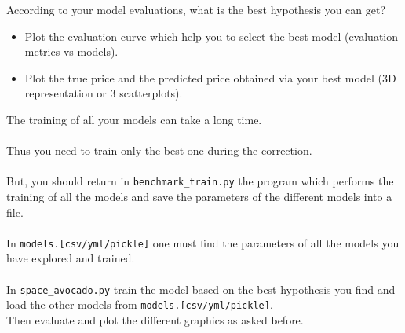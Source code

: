 According to your model evaluations, what is the best hypothesis you can get?
\begin{itemize}
  \item Plot the evaluation curve which help you to select the best model (evaluation metrics vs models).
  \item Plot the true price and the predicted price obtained via your best model (3D representation or 3 scatterplots).
\end{itemize}

The training of all your models can take a long time.\\
\\
Thus you need to train only the best one during the correction.\\
\\
But, you should return in \texttt{benchmark\_train.py} the program which performs the training of all the models and save the parameters of the different models into a file.\\
\\
In \texttt{models.[csv/yml/pickle]} one must find the parameters of all the models you have explored and trained.\\
\\
In \texttt{space\_avocado.py} train the model based on the best hypothesis you find and load the other models from \texttt{models.[csv/yml/pickle]}.\\
\newline
Then evaluate and plot the different graphics as asked before.